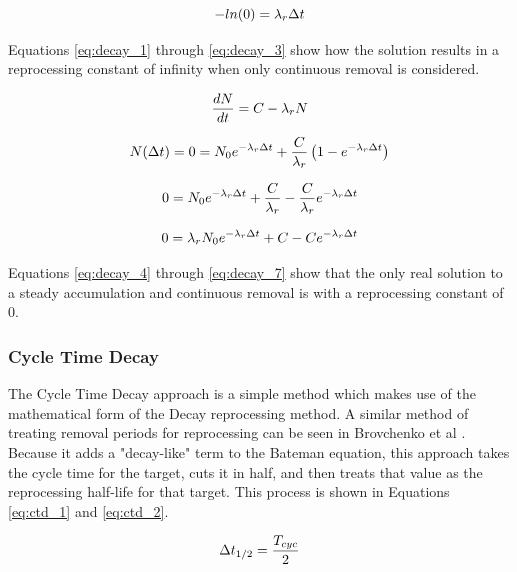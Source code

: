\begin{equation} \hfill
-ln(0) = \lambda_r \Delta t
\hfill\label{eq:decay_3} \end{equation}

Equations \eqref{eq:decay_1} through \eqref{eq:decay_3} show how the solution results in a reprocessing constant of infinity when only continuous removal is considered.

\begin{equation} \hfill
\frac{dN}{dt} = C -\lambda_r N
\hfill\label{eq:decay_4} \end{equation}

\begin{equation} \hfill
N(\Delta t) = 0 = N_0 e^{-\lambda_r \Delta t} + \frac{C}{\lambda_r} \left( 1 - e^{-\lambda_r \Delta t} \right)
\hfill\label{eq:decay_5} \end{equation}

\begin{equation} \hfill
0 = N_0 e^{-\lambda_r \Delta t} + \frac{C}{\lambda_r} - \frac{C}{\lambda_r} e^{-\lambda_r \Delta t}
\hfill\label{eq:decay_6} \end{equation}

\begin{equation} \hfill
0 = \lambda_r N_0 e^{-\lambda_r \Delta t} + C - C e^{-\lambda_r \Delta t}
\hfill\label{eq:decay_7} \end{equation}


 Equations \eqref{eq:decay_4} through \eqref{eq:decay_7} show that the only real solution to a steady accumulation and continuous removal is with a reprocessing constant of 0.

\subsubsection{Cycle Time Decay}

The Cycle Time Decay approach is a simple method which makes use of the mathematical form of the Decay reprocessing method. A similar method of treating removal periods for reprocessing can be seen in Brovchenko et al \cite{brovchenko_neutronic_2019}. Because it adds a "decay-like" term to the Bateman equation, this approach takes the cycle time for the target, cuts it in half, and then treats that value as the reprocessing half-life for that target. This process is shown in Equations \eqref{eq:ctd_1} and \eqref{eq:ctd_2}.

\begin{equation} \hfill
\Delta t_{1/2} = \frac{T_{cyc}}{2}
\hfill\label{eq:ctd_1} \end{equation}

